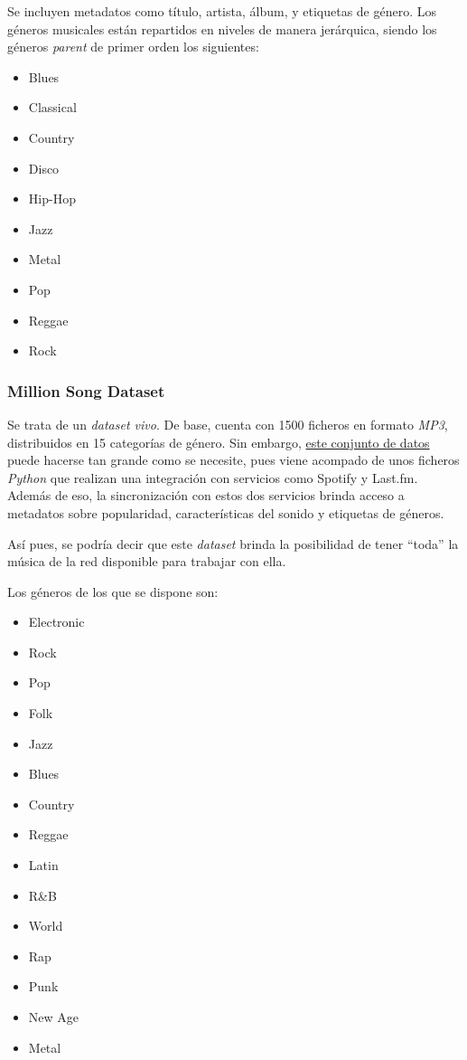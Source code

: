 Se incluyen metadatos como título, artista, álbum, y etiquetas de género. Los géneros musicales están repartidos en niveles de manera jerárquica, siendo los géneros \emph{parent} de primer orden los siguientes:

\begin{multicols}{4}
\begin{itemize}
    \item Blues
    \item Classical
    \item Country
    \item Disco
    \item Hip-Hop
    \item Jazz
    \item Metal
    \item Pop
    \item Reggae
    \item Rock
\end{itemize}
\end{multicols}

\subsubsection{Million Song Dataset}

Se trata de un \emph{dataset vivo}. De base, cuenta con 1500 ficheros en formato \emph{MP3}, distribuidos en 15 categorías de género. Sin embargo, \href{https://www.kaggle.com/datasets/undefinenull/million-song-dataset-spotify-lastfm}{este conjunto de datos} puede hacerse tan grande como se necesite, pues viene acompado de unos ficheros \emph{Python} que realizan una integración con servicios como Spotify y Last.fm. Además de eso, la sincronización con estos dos servicios brinda acceso a metadatos sobre popularidad, características del sonido y etiquetas de géneros.

Así pues, se podría decir que este \emph{dataset} brinda la posibilidad de tener ``toda'' la música de la red disponible para trabajar con ella.

Los géneros de los que se dispone son:
\begin{multicols}{4}
\begin{itemize}
    \item Electronic
    \item Rock
    \item Pop
    \item Folk
    \item Jazz
    \item Blues
    \item Country
    \item Reggae
    \item Latin
    \item R\&B
    \item World
    \item Rap
    \item Punk
    \item New Age
    \item Metal
\end{itemize}
\end{multicols}

